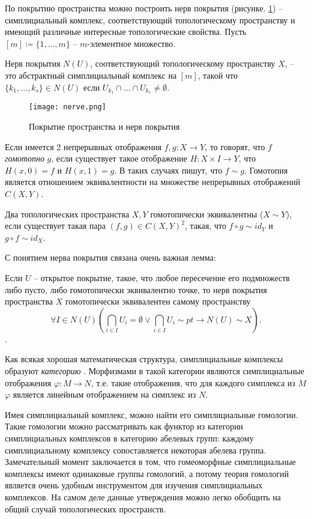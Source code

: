 По покрытию пространства можно построить нерв покрытия  (рисунке. \ref{nerve}) -- симплициальный комплекс, соответствующий топологическому пространству и имеющий различные интересные топологические свойства. Пусть $ [m] \coloneqq \{1, ..., m\} $ -- $m$-элементное множество.
\begin{definition}
	Нерв покрытия $N(U)$, соответствующий топологическому пространству $X$, -- это абстрактный симплициальный комплекс на $[m]$, такой что $ \{k_1, ..., k_s\} \in N(U) $ если $ U_{k_1} \cap ... \cap U_{k_s} \neq \emptyset $.
\end{definition}
\begin{figure}[h!]
	\begin{center}
		\texttt{[image: nerve.png]}\\
		\caption{Покрытие пространства и нерв покрытия}
		\label{nerve}
	\end{center}
\end{figure}
Если имеется 2 непрерывных отображения $f, g : X \to Y$, то говорят, что $f$ {\it гомотопно} $g$, если существует такое отображение ${H: X\times I \to Y}$, что ${H(x,0) = f}$ и ${H(x,1) = g}$. В таких случаях пишут, что ${f \sim g}$. Гомотопия является отношением эквивалентности на множестве непрерывных отображений ${ C(X,Y) }$.


Два топологических пространства $X,Y$ гомотопически эквивалентны (${X \sim Y}$), если существует такая пара ${(f,g) \in C(X,Y)^2}$, такая, что ${f \circ g \sim id_Y}$ и ${g \circ f \sim id_X}$.

С понятием нерва покрытия связана очень важная лемма:
\begin{lemma*}[о нерве]
	Если $U$ -- открытое покрытие, такое, что любое пересечение его подмножеств либо пусто, либо гомотопически эквивалентно точке, то нерв покрытия пространства $X$ гомотопически эквивалентен самому пространству
	\[ \forall I \in N(U) \left( \bigcap\limits_{i \in I} U_i = \emptyset \lor \bigcap\limits_{i \in I} U_i \sim pt \rightarrow N(U) \sim X \right). \].
\end{lemma*}

Как всякая хорошая математическая структура, симплициальные комплексы образуют {\it категорию} . Морфизмами в такой категории являются симплициальные отображения $\varphi : M \to N$, т.е. такие отображения, что для каждого симплекса из $M$ $\varphi$ является линейным отображением на симплекс из $N$. 

Имея симплициальный комплекс, можно найти его симплициальные гомологии. Такие гомологии можно рассматривать как функтор из категории симплициальных комплексов в категорию абелевых групп: каждому симплициальному комплексу сопоставляется некоторая абелева группа. Замечательный момент заключается в том, что гомеоморфные симплициальные комплексы имеют одинаковые группы гомологий, а потому теория гомологий является очень удобным инструментом для изучения симплициальных комплексов. На самом деле данные утверждения можно легко обобщить на общий случай топологических пространств.

